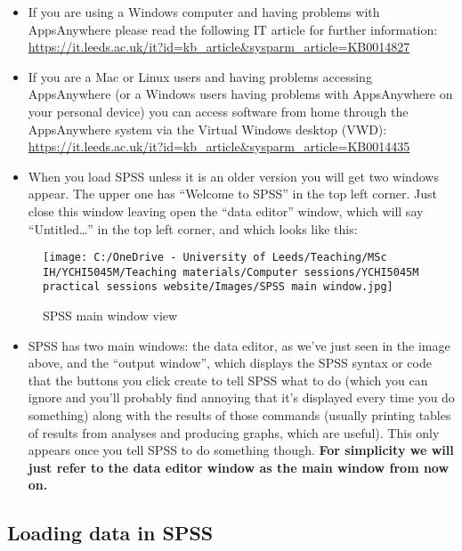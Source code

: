 \documentclass[
]{book}
\providecommand{\tightlist}{%
  \setlength{\itemsep}{0pt}\setlength{\parskip}{0pt}}
\begin{document}
\begin{itemize}
\item
  If you are using a Windows computer and having problems with AppsAnywhere please read the following IT article for further information: \url{https://it.leeds.ac.uk/it?id=kb_article\&sysparm_article=KB0014827}
\item
  If you are a Mac or Linux users and having problems accessing AppsAnywhere (or a Windows users having problems with AppsAnywhere on your personal device) you can access software from home through the AppsAnywhere system via the Virtual Windows desktop (VWD): \url{https://it.leeds.ac.uk/it?id=kb_article\&sysparm_article=KB0014435}
\item
  When you load SPSS unless it is an older version you will get two windows appear. The upper one has ``Welcome to SPSS'' in the top left corner. Just close this window leaving open the ``data editor'' window, which will say ``Untitled\ldots{}'' in the top left corner, and which looks like this:
\end{itemize}

\begin{figure}
\centering
\texttt{[image: C:/OneDrive - University of Leeds/Teaching/MSc IH/YCHI5045M/Teaching materials/Computer sessions/YCHI5045M practical sessions website/Images/SPSS main window.jpg]}
\caption{SPSS main window view}
\end{figure}

\begin{itemize}
\tightlist
\item
  SPSS has two main windows: the data editor, as we've just seen in the image above, and the ``output window'', which displays the SPSS syntax or code that the buttons you click create to tell SPSS what to do (which you can ignore and you'll probably find annoying that it's displayed every time you do something) along with the results of those commands (usually printing tables of results from analyses and producing graphs, which are useful). This only appears once you tell SPSS to do something though. \textbf{For simplicity we will just refer to the data editor window as the main window from now on.}
\end{itemize}

\hypertarget{loading-data-in-spss}{%
\subsection{Loading data in SPSS}\label{loading-data-in-spss}}
\end{document}
